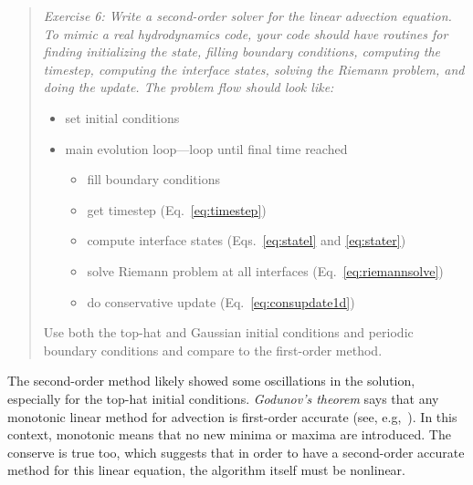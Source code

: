 \documentclass[11pt]{article}
\begin{document}
\begin{quote}
{\em Exercise 6: Write a second-order solver for the linear advection
  equation.  To mimic a real hydrodynamics code, your code should have
  routines for finding initializing the state, filling boundary conditions,
  computing the timestep,
  computing the interface states, solving the Riemann problem, and
  doing the update.  The problem flow should look like:
  \begin{itemize}
    \item set initial conditions
    \item main evolution loop---loop until final time reached
    \begin{itemize}
      \item fill boundary conditions
      \item get timestep (Eq.~\ref{eq:timestep})
      \item compute interface states (Eqs.~\ref{eq:statel} and \ref{eq:stater})
      \item solve Riemann problem at all interfaces (Eq.~\ref{eq:riemannsolve})
      \item do conservative update (Eq.~\ref{eq:consupdate1d})
    \end{itemize}
  \end{itemize}
Use both the top-hat and Gaussian initial conditions and periodic boundary
conditions and compare to the first-order method.
}
\end{quote}

The second-order method likely showed some oscillations in the
solution, especially for the top-hat initial conditions.  {\em
  Godunov's theorem} says that any monotonic linear method for
advection is first-order accurate (see, e.g,~\cite{laney}).  In this
context, monotonic means that no new minima or maxima are introduced.
The conserve is true too, which suggests that in order to have a
second-order accurate method for this linear equation, the algorithm
itself must be nonlinear.
\end{document}
